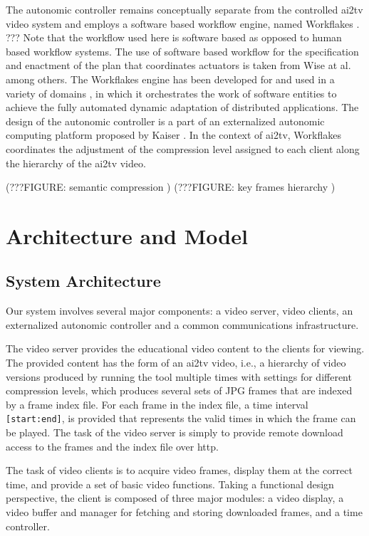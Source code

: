 \documentclass{sig-alternate}
\begin{document}
The autonomic controller remains conceptually separate from the
controlled ai2tv video system and employs a software based workflow
engine, named Workflakes \cite{PEPPO}.  ??? Note that the workflow
used here is software based as opposed to human based workflow
systems.  The use of software based workflow for the specification and
enactment of the plan that coordinates actuators is taken from Wise at
al. \cite{OSTERWEIL} among others.  The Workflakes engine has been
developed for and used in a variety of domains \cite{AMS,ICSE}, in
which it orchestrates the work of software entities to achieve the
fully automated dynamic adaptation of distributed applications.  The
design of the autonomic controller is a part of an externalized
autonomic computing platform proposed by Kaiser \cite{refarch}.  In
the context of ai2tv, Workflakes coordinates the adjustment of the
compression level assigned to each client along the hierarchy of the
ai2tv video.

(???FIGURE: semantic compression )
(???FIGURE: key frames hierarchy )

\section{Architecture and Model} \label{design}
\subsection{System Architecture}
Our system involves several major components: a video server, video
clients, an externalized autonomic controller and a common
communications infrastructure.

The video server provides the educational video content to the clients
for viewing.  The provided content has the form of an ai2tv video,
i.e., a hierarchy of video versions produced by running the tool
multiple times with settings for different compression levels, which
produces several sets of JPG frames that are indexed by a frame index
file.  For each frame in the index file, a time interval
\texttt{[start:end]}, is provided that represents the valid times in
which the frame can be played.  The task of the video server is simply
to provide remote download access to the frames and the index file
over http.

The task of video clients is to acquire video frames, display them at
the correct time, and provide a set of basic video functions.  Taking
a functional design perspective, the client is composed of three major
modules: a video display, a video buffer and manager for fetching and
storing downloaded frames, and a time controller.
\end{document}
